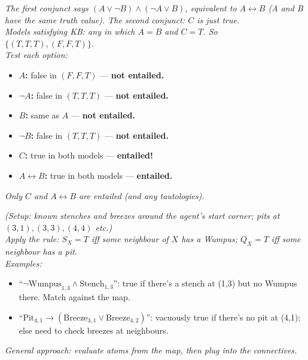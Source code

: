 \documentclass[11pt, a4paper]{article}
\begin{document}
\begin{exambox}[(MCQ, mark all that apply): Which of the following sentences are entailed by $KB = \{(A \lor \neg B) \land (\neg A \lor B), C\}$?]
\textit{The first conjunct says $(A \lor \neg B) \land (\neg A \lor B)$, equivalent to $A \leftrightarrow B$ (A and B have the same truth value). The second conjunct: $C$ is just true.}\\[0.3em]
\textit{Models satisfying KB: any in which $A = B$ and $C = T$. So $\{(T,T,T), (F,F,T)\}$.}\\[0.3em]
\textit{Test each option:}
\begin{itemize}[leftmargin=*, itemsep=0pt, topsep=0pt]
  \item \textbf{$A$:} false in $(F, F, T)$ — \textbf{not entailed.}
  \item \textbf{$\neg A$:} false in $(T, T, T)$ — \textbf{not entailed.}
  \item \textbf{$B$:} same as $A$ — \textbf{not entailed.}
  \item \textbf{$\neg B$:} false in $(T,T,T)$ — \textbf{not entailed.}
  \item \textbf{$C$:} true in both models — \textbf{entailed!}
  \item \textbf{$A \leftrightarrow B$:} true in both models — \textbf{entailed.}
\end{itemize}
\textit{Only $C$ and $A \leftrightarrow B$ are entailed (and any tautologies).}
\end{exambox}

\begin{exambox}
\textit{(Setup: known stenches and breezes around the agent's start corner; pits at $(3,1), (3,3), (4,4)$ etc.)}\\[0.3em]
\textit{Apply the rule: $S_X = T$ iff some neighbour of $X$ has a Wumpus; $Q_X = T$ iff some neighbour has a pit.}\\[0.3em]
\textit{Examples:}
\begin{itemize}[leftmargin=*, itemsep=0pt, topsep=0pt]
  \item ``$\neg \mathrm{Wumpus}_{1,3} \land \mathrm{Stench}_{1,3}$'': true if there's a stench at (1,3) but no Wumpus there. Match against the map.
  \item ``$\mathrm{Pit}_{4,1} \rightarrow (\mathrm{Breeze}_{3,1} \lor \mathrm{Breeze}_{4,2})$'': vacuously true if there's no pit at (4,1); else need to check breezes at neighbours.
\end{itemize}
\textit{General approach: evaluate atoms from the map, then plug into the connectives.}
\end{exambox}
\end{document}
